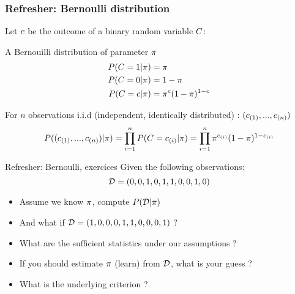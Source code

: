 


\begin{frame}
  \frametitle{Refresher:  Bernoulli distribution}
  Let ${c}$ be the outcome of a binary random variable ${C}$: 
  \begin{block}{A Bernouilli distribution of parameter $\pi$}
    \begin{align*}
      P({C}=1|\pi) &= \pi\\ 
      P({C}=0|\pi) &= 1-\pi \\
      P({C}={c}|\pi) &= \pi^{{c}} (1-\pi)^{1-{c}} \\
    \end{align*}
  \end{block}
  For  $n$ observations i.i.d  (independent, identically distributed) : $({c}_{(1)}, ... , {c}_{(n)} )$
    $$
    P(({c}_{(1)}, ... , {c}_{(n)} )|\pi) = \prod_{i=1}^n P({C}={c}_{(i)}|\pi) = \prod_{i=1}^n \pi^{{c}_{(i)}} (1-\pi)^{1-{c}_{(i)}}
    $$
  \end{frame}


  \begin{frame}{Refresher: Bernoulli, exercices}
    Given the following observations: 
    $$
    \mathcal{D} = ( 0, 0, 1 , 0 ,1, 1, 0, 0, 1, 0)
    $$
    \begin{itemize}
    \item Assume we know $\pi$, compute
      $P(\mathcal{D}|\pi)$
    \item And what if $    \mathcal{D} = ( 1, 0, 0 , 0 ,1, 1, 0, 0, 0, 1)$ ? 
    \item What are the sufficient statistics under our assumptions ? 
    \item If you should estimate $\pi$ (learn) from
      $\mathcal{D}$, what is your guess ? 
    \item What is the underlying criterion ? 
    \end{itemize}
  \end{frame}


